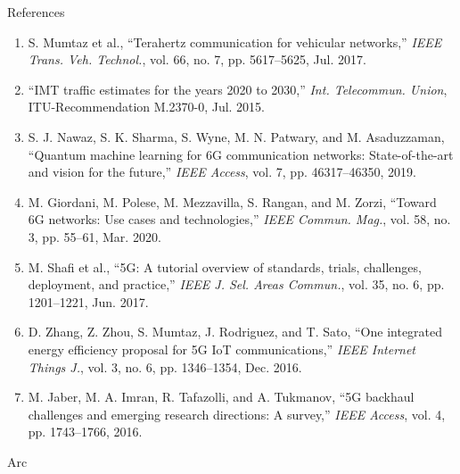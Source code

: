 \documentclass{beamer}
\begin{document}
\begin{frame}{References}
\begin{footnotesize}
\begin{enumerate}
    \item S. Mumtaz et al., “Terahertz communication for vehicular networks,” 
    \textit{IEEE Trans. Veh. Technol.}, vol. 66, no. 7, pp. 5617–5625, Jul. 2017.
    
    \item “IMT traffic estimates for the years 2020 to 2030,” 
    \textit{Int. Telecommun. Union}, ITU-Recommendation M.2370-0, Jul. 2015.
    
    \item S. J. Nawaz, S. K. Sharma, S. Wyne, M. N. Patwary, and M. Asaduzzaman, 
    “Quantum machine learning for 6G communication networks: State-of-the-art and vision for the future,” 
    \textit{IEEE Access}, vol. 7, pp. 46317–46350, 2019.
    
    \item M. Giordani, M. Polese, M. Mezzavilla, S. Rangan, and M. Zorzi, 
    “Toward 6G networks: Use cases and technologies,” 
    \textit{IEEE Commun. Mag.}, vol. 58, no. 3, pp. 55–61, Mar. 2020.
    
    \item M. Shafi et al., “5G: A tutorial overview of standards, trials, challenges, deployment, and practice,” 
    \textit{IEEE J. Sel. Areas Commun.}, vol. 35, no. 6, pp. 1201–1221, Jun. 2017.
    
    \item D. Zhang, Z. Zhou, S. Mumtaz, J. Rodriguez, and T. Sato, 
    “One integrated energy efficiency proposal for 5G IoT communications,” 
    \textit{IEEE Internet Things J.}, vol. 3, no. 6, pp. 1346–1354, Dec. 2016.
    
    \item M. Jaber, M. A. Imran, R. Tafazolli, and A. Tukmanov, 
    “5G backhaul challenges and emerging research directions: A survey,” 
    \textit{IEEE Access}, vol. 4, pp. 1743–1766, 2016.
\end{enumerate}
\end{footnotesize}
\end{frame}

\begin{frame}{Arc}
\end{frame}
\end{document}
